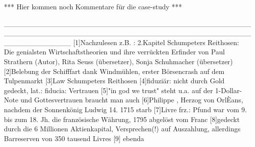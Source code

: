 *** Hier kommen noch Kommentare f{\"u}r die case-study ***

_____________________________________________________________________________________________________________
[1]Nachzulesen z.B. : 2.Kapitel Schumpeters Reithosen: Die genialsten Wirtschaftstheorien und ihre verr{\"u}ckten Erfinder von Paul Strathern (Autor), Rita Seuss ({\"u}bersetzer), Sonja Schuhmacher ({\"u}bersetzer)
[2]Belebung der Schifffart dank Windm{\"u}hlen, erster B{\"o}rsencrash auf dem Tulpenmarkt
[3]Law Schumpeters Reithosen
[4]fiduzi{\"a}r: nicht durch Gold gedeckt, lat.: fiducia: Vertrauen
[5]"in god we trust" steht u.a. auf der 1-Dollar-Note und Gottesvertrauen braucht man auch
[6]Philippe , Herzog von OrlÈans, nachdem der Sonnenk{\"o}nig Ludwig 14. 1715 starb
[7]Livre frz.: Pfund war vom 9. bis zum 18. Jh. die franz{\"o}sische W{\"a}hrung, 1795 abgel{\"o}st vom Franc
[8]gedeckt durch die 6 Millionen Aktienkapital, Versprechen(!) auf Auszahlung, allerdings Barreserven von 350 tausend Livres
[9] ebenda
